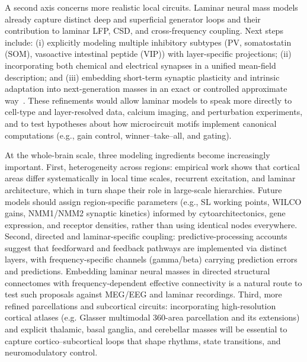 \documentclass[12pt]{article}
\numberwithin{equation}{section}
\begin{document}
A second axis concerns more realistic local circuits. Laminar neural mass models already capture distinct deep and superficial generator loops and their contribution to laminar LFP, CSD, and cross-frequency coupling.\cite{sanchez-todoPhysicalNeuralMass2023,Ruffini2020P118} Next steps include: (i) explicitly modeling multiple inhibitory subtypes (PV, somatostatin (SOM), vasoactive intestinal peptide (VIP)) with layer-specific projections; (ii) incorporating both chemical and electrical synapses in a unified mean-field description; and (iii) embedding short-term synaptic plasticity and intrinsic adaptation into next-generation masses in an exact or controlled approximate way~\cite{Devalle:2017aa,taherExactNeuralMass2020,chenExactMeanfieldModels2022}. These refinements would allow laminar models to speak more directly to cell-type and layer-resolved data, calcium imaging, and perturbation experiments, and to test hypotheses about how microcircuit motifs implement canonical computations (e.g., gain control, winner–take–all, and gating).

At the whole-brain scale, three modeling ingredients become increasingly important. First, heterogeneity across regions: empirical work shows that cortical areas differ systematically in local time scales, recurrent excitation, and laminar architecture, which in turn shape their role in large-scale hierarchies.\cite{mejiasFeedforwardFeedbackFrequencydependent2016,rautOrganizationPropagatedIntrinsic2020} Future models should assign region-specific parameters (e.g., SL working points, WILCO gains, NMM1/NMM2 synaptic kinetics) informed by cytoarchitectonics, gene expression, and receptor densities, rather than using identical nodes everywhere. Second, directed and laminar-specific coupling: predictive-processing accounts suggest that feedforward and feedback pathways are implemented via distinct layers, with frequency-specific channels (gamma/beta) carrying prediction errors and predictions.\cite{bastosCanonicalMicrocircuitsPredictive2012,fristonFreeenergyPrincipleUnified2010} Embedding laminar neural masses in directed structural connectomes with frequency-dependent effective connectivity is a natural route to test such proposals against MEG/EEG and laminar recordings. Third, more refined parcellations and subcortical circuits: incorporating high-resolution cortical atlases (e.g. Glasser multimodal 360-area parcellation and its extensions)\cite{glasserMultimodalParcellationHuman2016} and explicit thalamic, basal ganglia, and cerebellar masses\cite{kringelbach_dynamic_2020,cofreWholeBrainModelsExplore2020,rautOrganizationPropagatedIntrinsic2020} will be essential to capture cortico–subcortical loops that shape rhythms, state transitions, and neuromodulatory control.
\end{document}

